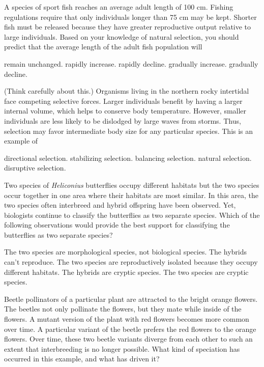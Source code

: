 \question
A species of sport fish reaches an average adult length of 100 cm. Fishing regulations require that only individuals longer than 75 cm may be kept. Shorter fish must be released because they have greater reproductive output relative to large individuals. Based on your knowledge of natural selection, you should predict that the average length of the adult fish population will

\begin{choices}
\correctchoice remain unchanged. 
\choice rapidly increase. 
\choice rapidly decline. 
\choice gradually increase. 
\choice gradually decline. 
\end{choices}

\question
(Think carefully about this.) Organisms living in the northern rocky intertidal face competing selective forces. Larger individuals benefit by having a larger internal volume, which helps to conserve body temperature. However, smaller individuals are less likely to be dislodged by large waves from storms. Thus, selection may favor intermediate body size for any particular species. This is an example of

\begin{choices}
\choice directional selection. 
\choice stabilizing selection. 
\correctchoice balancing selection. 
\choice natural selection. 
\choice disruptive selection. 
\end{choices}


\question
Two species of \textit{Heliconius} butterflies occupy different habitats but the two species occur together in one area where their habitats are most similar. In this area, the two species often interbreed and hybrid offspring have been observed.  Yet, biologists continue to classify the butterflies as two separate species.  Which of the following observations would provide the best support for classifying the butterflies as two separate species? 

\begin{choices}
\choice The two species are morphological species, not biological species.
\correctchoice The hybrids can't reproduce.
\choice The two species are reproductively isolated because they occupy different habitats.
\choice The hybrids are cryptic species.
\choice The two species are cryptic species.
\end{choices}

\question
Beetle pollinators of a particular plant are attracted to the bright orange flowers. The beetles not only pollinate the flowers, but they mate while inside of the flowers. A mutant version of the plant with red flowers becomes more common over time. A particular variant of the beetle prefers the red flowers to the orange flowers. Over time, these two beetle variants diverge from each other to such an extent that interbreeding is no longer possible. What kind of speciation has occurred in this example, and what has driven it?

